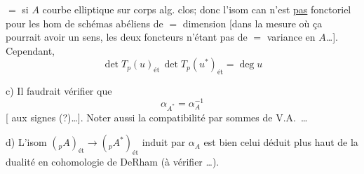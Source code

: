 $=$ si $A$ courbe elliptique sur corps alg. clos; donc l'isom can n'est \uline{pas} fonctoriel pour les hom de schémas abéliens de $=$ dimension [dans la mesure où ça pourrait avoir un sens, les deux foncteurs n'étant pas de $=$ variance en $A$\ldots]. Cependant, 
\[
\boxed{\det T_p(u)_{\mathrm{ét}}\,\det T_p(u^*)_{\mathrm{ét}}=\deg u}
\]

c) Il faudrait vérifier que
\[
\alpha_{A^*}=\alpha_A^{-1}
\]
[ aux signes (?)\ldots]. Noter aussi la compatibilité par sommes de V.A.\ \ldots

 d) L'isom $({}_pA)_{\mathrm{ét}}\longrightarrow({}_pA^*)_{\mathrm{ét}}$ induit par $\alpha_A$ est bien celui déduit plus haut de la dualité en cohomologie de DeRham (à vérifier \ldots).

